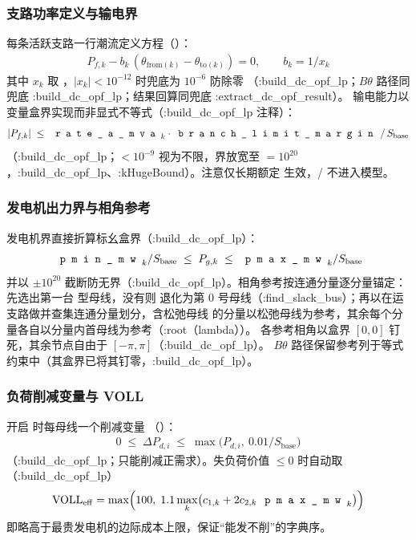 \subsubsection*{支路功率定义与输电界}
每条活跃支路一行潮流定义方程（）：
\begin{align*}
P_{f,k} - b_k\,(\theta_{\mathrm{from}(k)}-\theta_{\mathrm{to}(k)}) = 0,
\qquad b_k = 1/x_k
\end{align*}
其中 $x_k$ 取 ，$|x_k|<10^{-12}$ 时兜底为 $10^{-6}$ 防除零
（:build\_dc\_opf\_lp；$B\theta$ 路径同兜底 :build\_dc\_opf\_lp；结果回算同兜底 :extract\_dc\_opf\_result）。
输电能力以变量盒界实现而非显式不等式（:build\_dc\_opf\_lp 注释）：
\begin{align*}
|P_{f,k}| \;\le\; \fld{rate\_a\_mva}_k\cdot\fld{branch\_limit\_margin}\,/\,S_{\mathrm{base}}
\end{align*}
（:build\_dc\_opf\_lp；$<10^{-9}$ 视为不限，界放宽至
$=10^{20}$，:build\_dc\_opf\_lp、:kHugeBound）。注意仅长期额定 
生效，/ 不进入模型。

\subsubsection*{发电机出力界与相角参考}
发电机界直接折算标幺盒界（:build\_dc\_opf\_lp）：
\begin{align*}
\fld{pmin\_mw}_k/S_{\mathrm{base}} \;\le\; P_{g,k} \;\le\;
\fld{pmax\_mw}_k/S_{\mathrm{base}}
\end{align*}
并以 $\pm 10^{20}$ 截断防无界（:build\_dc\_opf\_lp）。相角参考按连通分量逐分量锚定：
 先选出第一台  型母线，没有则
退化为第 0 号母线（:find\_slack\_bus）；再以在运支路做并查集连通分量划分，含松弛母线
的分量以松弛母线为参考，其余每个分量各自以分量内首母线为参考（:root（lambda））。
各参考相角以盒界 $[0,0]$ 钉死，其余节点自由于 $[-\pi,\pi]$（:build\_dc\_opf\_lp）。
$B\theta$ 路径保留参考列于等式约束中（其盒界已将其钉零，:build\_dc\_opf\_lp）。

\subsubsection*{负荷削减变量与 VOLL}
开启  时每母线一个削减变量
（）：
\begin{align*}
0 \;\le\; \Delta P_{d,i} \;\le\; \max\!\bigl(P_{d,i},\ 0.01/S_{\mathrm{base}}\bigr)
\end{align*}
（:build\_dc\_opf\_lp；只能削减正需求）。失负荷价值 $\le 0$ 时自动取
（:build\_dc\_opf\_lp）
\begin{align*}
\mathrm{VOLL}_{\mathrm{eff}} = \max\Bigl(100,\;
1.1\max_{k}\bigl(c_{1,k}+2c_{2,k}\,\fld{pmax\_mw}_k\bigr)\Bigr)
\end{align*}
即略高于最贵发电机的边际成本上限，保证“能发不削”的字典序。

